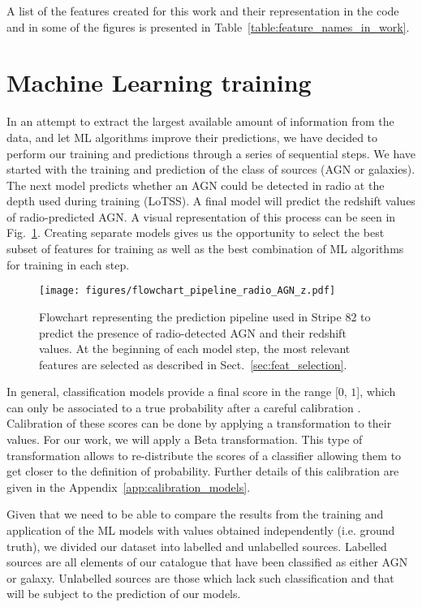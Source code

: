 \documentclass{aa}
\begin{document}
A list of the features created for this work and their representation in the code and in some of the figures is presented in Table~\ref{table:feature_names_in_work}.

\section{Machine Learning training}\label{sec:ML_training}

In an attempt to extract the largest available amount of information from the data, and let ML algorithms improve their predictions, we have decided to perform our training and predictions through a series of sequential steps. We have started with the training and prediction of the class of sources (AGN or galaxies). The next model predicts whether an AGN could be detected in radio at the depth used during training (LoTSS). A final model will predict the redshift values of radio-predicted AGN. A visual representation of this process can be seen in Fig.~\ref{fig:pipeline_flowchart}. Creating separate models gives us the opportunity to select the best subset of features for training as well as the best combination of ML algorithms for training in each step.

\begin{figure}
   \centering
   \texttt{[image: figures/flowchart\_pipeline\_radio\_AGN\_z.pdf]}
   \caption{Flowchart representing the prediction pipeline used in Stripe 82 to predict the presence of radio-detected AGN and their redshift values. At the beginning of each model step, the most relevant features are selected as described in Sect.~\ref{sec:feat_selection}.}
   \label{fig:pipeline_flowchart}
\end{figure}

In general, classification models provide a final score in the range [$0$, $1$], which can only be associated to a true probability after a careful calibration  \citep{10.1214/17-EJS1338SI, pmlr-v54-kull17a}. Calibration of these scores can be done by applying a transformation to their values. For our work, we will apply a Beta transformation. This type of transformation allows to re-distribute the scores of a classifier allowing them to get closer to the definition of probability. Further details of this calibration are given in the Appendix~\ref{app:calibration_models}.

Given that we need to be able to compare the results from the training and application of the ML models with values obtained independently (i.e. ground truth), we divided our dataset into labelled and unlabelled sources. Labelled sources are all elements of our catalogue that have been classified as either AGN or galaxy. Unlabelled sources are those which lack such classification and that will be subject to the prediction of our models.  
\end{document}
